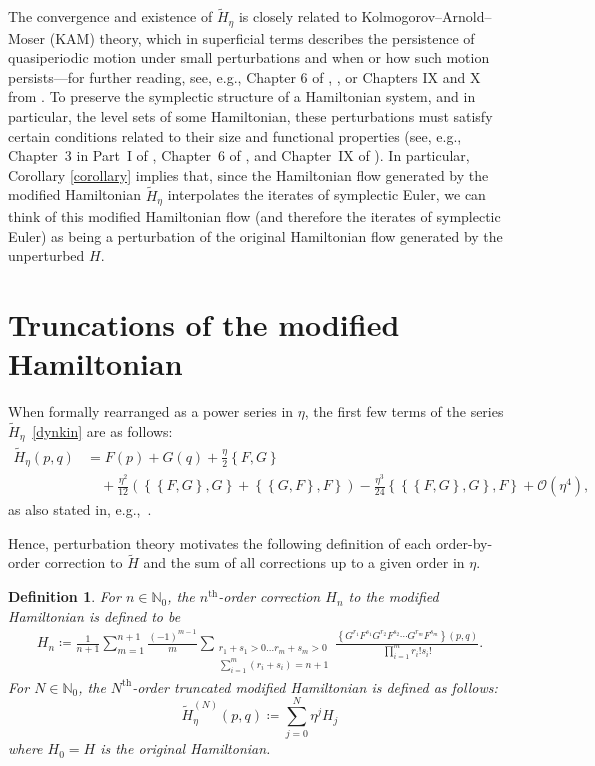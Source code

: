 \documentclass[11pt]{article}
\newtheorem{definition}{Definition}
\newcommand{\N}{\mathbb{N}}
\begin{document}
The convergence and existence of $\widetilde{H}_{\eta}$ is closely related to Kolmogorov–Arnold–Moser (KAM) theory, which in superficial terms describes the persistence of quasiperiodic motion under small perturbations and when or how such motion persists---for further reading, see, e.g., Chapter 6 of \cite{Arnold2006}, \cite{Lazutkin1993}, or Chapters IX and X from \cite{Hairer2006}. To preserve the symplectic structure of a Hamiltonian system, and in particular, the level sets of some Hamiltonian, these perturbations must satisfy certain conditions related to their size and functional properties (see, e.g., Chapter~3 in Part~I of \cite{Lazutkin1993}, 
Chapter~6 of \cite{Jose1998}, and Chapter~IX of \cite{Hairer2006}). In particular, Corollary \ref{corollary} implies that, since the Hamiltonian flow generated by the modified Hamiltonian $\widetilde{H}_{\eta}$ interpolates the iterates of symplectic Euler, we can think of this modified Hamiltonian flow (and therefore the iterates of symplectic Euler) as being a perturbation of the original Hamiltonian flow generated by the unperturbed $H$. 

\section{Truncations of the modified Hamiltonian}\label{Section_TMC_Regret}

When formally rearranged as a power series in $\eta$, the first few terms of the series $\tilde H_\eta$~\eqref{dynkin} are as follows: 
\begin{align*} 
    \widetilde{H}_{\eta}\left(p,q\right) &= F\left(p\right)+G\left(q\right) +\frac{\eta}{2}\left\{F,G\right\} \nonumber\\ 
    &\quad+\frac{\eta^{2}}{12}\left(\left\{\left\{F,G\right\},G\right\}+\left\{\left\{G,F\right\},F\right\}\right)
    -\frac{\eta^{3}}{24}\left\{\left\{\left\{F,G\right\},G\right\},F\right\}+\mathcal{O}\left(\eta^{4}\right),\nonumber
\end{align*}
as also stated in, e.g.,~\citep{Jacobson1979,Hall2015,Casas,Yoshida1993}.

Hence, perturbation theory motivates the following definition of each order-by-order correction to $\widetilde{H}$ and the sum of all corrections up to a given order in $\eta$.

\begin{definition}\label{def1}
    For $n\in\N_{0}$, the $n^{\text{th}}$-order correction $H_{n}$ to the modified Hamiltonian is defined to be
    \begin{gather}
        H_{n}\coloneqq \frac{1}{n+1}\sum_{m=1}^{n+1}\frac{(-1)^{m-1}}{m}\sum_{\substack{ r_{1}+s_{1}>0  \dots r_{m}+s_{m}>0 \\ \sum_{i=1}^m (r_i+s_i)=n+1}}{\frac{\left\{G^{r_{1}}F^{s_{1}}G^{r_{2}}F^{s_{2}}\cdots G^{r_{m}}F^{s_{m}}\right\} (p,q)}{\prod_{i=1}^{m}{r_{i}!s_{i}!}}}.\label{correction}
    \end{gather}
    For $N \in \N_{0}$, the $N^{\text{th}}$-order truncated modified Hamiltonian is defined as follows:
    $$\widetilde{H}_{\eta}^{(N)}(p, q)\coloneqq \sum_{j=0}^{N}{\eta^{j}H_{j}}$$
    where $H_0 = H$ is the original Hamiltonian.
\end{definition}
\end{document}
